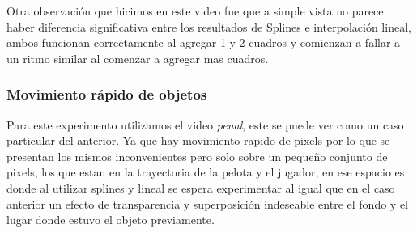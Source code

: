 Otra observación que hicimos en este video fue que a simple vista no parece haber diferencia significativa entre los resultados de Splines e interpolación lineal, ambos funcionan correctamente al agregar 1 y 2 cuadros y comienzan a fallar a un ritmo similar al comenzar a agregar mas cuadros. 

\subsubsection{Movimiento rápido de objetos}

Para este experimento utilizamos el video \textit{penal}, este se puede ver como un caso particular del anterior. Ya que hay movimiento rapido de pixels por lo que se presentan los mismos inconvenientes pero solo sobre un pequeño conjunto de pixels, los que estan en la trayectoria de la pelota y el jugador, en ese espacio es donde al utilizar splines y lineal se espera experimentar al igual que en el caso anterior un efecto de transparencia y superposición indeseable entre el fondo y el lugar donde estuvo el objeto previamente.


